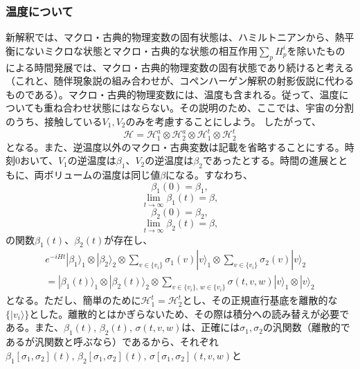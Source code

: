 \subsubsection{温度について}
新解釈では、マクロ・古典的物理変数の固有状態は、ハミルトニアンから、熱平衡にないミクロな状態とマクロ・古典的な状態の相互作用$\sum_pH_p^i$を除いたものによる時間発展では、マクロ・古典的物理変数の固有状態であり続けると考える（これと、随伴現象説の組み合わせが、コペンハーゲン解釈の射影仮説に代わるものである）。マクロ・古典的物理変数には、温度も含まれる。従って、温度についても重ね合わせ状態にはならない。その説明のため、ここでは、宇宙の分割のうち、接触している${V_1,V_2}$のみを考慮することにしよう。 したがって、
\begin{equation}
    \mathcal{H} = \mathcal{H}_1^a \otimes \mathcal{H}_2^a \otimes \mathcal{H}_1^t \otimes \mathcal{H}_2^t 
\end{equation}
となる。また、逆温度以外のマクロ・古典変数は記載を省略することにする。時刻$0$おいて、$V_1$の逆温度は$\beta_1$、$V_2$の逆温度は$\beta_2$であったとする。時間の進展とともに、両ボリュームの温度は同じ値$\beta$になる。すなわち、
\begin{equation}
    \beta_1(0) = \beta_1,
\end{equation}
\begin{equation}
    \lim_{t \to \infty} \beta_1(t) = \beta,
\end{equation}
\begin{equation}
    \beta_2(0) = \beta_2,
\end{equation}
\begin{equation}
    \lim_{t \to \infty} \beta_2(t) = \beta,
\end{equation}
の関数$\beta_1(t)$、$\beta_2(t)$が存在し、
\begin{equation}
\begin{aligned}
    e^{-iHt}|\beta_1 \rangle_1 \otimes |\beta_2 \rangle_2 \otimes \sum_{v \in \{v_i\}} \sigma_1(v) |v\rangle_1 \otimes \sum_{v \in \{v_i\}}  \sigma_2(v) |v\rangle_2\\
    =  |\beta_1(t) \rangle_1 \otimes |\beta_2(t)\rangle_2 \otimes   \sum_{v \in \{v_i\} ,\, w \in \{v_i\}} \sigma(t,v,w)|v\rangle_1 \otimes |v\rangle_2
\end{aligned}
\end{equation}
となる。ただし、簡単のために$\mathcal{H}_1^t = \mathcal{H}_2^t$とし、その正規直行基底を離散的な$\{|v_i\rangle\}$とした。離散的とはかぎらないため、その際は積分への読み替えが必要である。また、$\beta_1(t),\,\beta_2(t),\,\sigma(t,v,w)$は、正確には$\sigma_1,\sigma_2$の汎関数（離散的であるが汎関数と呼ぶなら）であるから、それぞれ$\beta_1[\sigma_1,\sigma_2](t),\,\beta_2[\sigma_1,\sigma_2](t),\,\sigma[\sigma_1,\sigma_2](t,v,w)$と